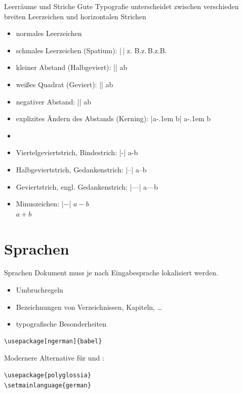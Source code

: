 \documentclass[
	vorläufig=true,
	datum=2016-10-28,
	titel={Allgemeine Formatierung und Pakete},
	web=false,
]{../tex/latexkurs-slides}
\begin{document}
\begin{frame}[fragile]{Leerräume und Striche}
	Gute Typografie unterscheidet zwischen verschieden breiten Leerzeichen und horizontalen Strichen
			\begin{itemize}
				\item normales Leerzeichen
				\item schmales Leerzeichen (Spatium): |\,| \hfill z. B.\quad z.\,B.\quad z.B.
				\item kleiner Abstand (Halbgeviert): |\enskip| \hfill a\enskip b
				\item weißes Quadrat (Geviert): |\quad| \hfill a\quad b
				\item negativer Abstand: |\!| \hfill a\!b
				\pause
				\item explizites Ändern des Abstands (Kerning): |a\kern-.1em b| \hfill a\kern-.1em b
				\item[] \pause
				\item Viertelgeviertstrich, Bindestrich: |-| \hfill a-b
				\item Halbgeviertstrich, Gedankenstrich: |--| \hfill a–b
				\item Geviertstrich, engl. Gedankenstrich: |---| \hfill a—b
				\item Minuszeichen: |$-$| \hfill $a-b$\\\hfill $a+b$
			\end{itemize}
\end{frame}

\section{Sprachen}
\begin{frame}[fragile]{Sprachen}
Dokument muss je nach Eingabesprache lokalisiert werden.
\begin{itemize}
	\item Umbruchregeln
	\item Bezeichnungen von Verzeichnissen, Kapiteln, …
	\item typografische Besonderheiten
\end{itemize}
\begin{lstlisting}
\usepackage[ngerman]{babel}
\end{lstlisting}
\pause
\vfill
Modernere Alternative für  und \XeLaTeX:
\begin{lstlisting}
\usepackage{polyglossia}
\setmainlanguage{german}
\end{lstlisting}
\end{frame}
\end{document}
